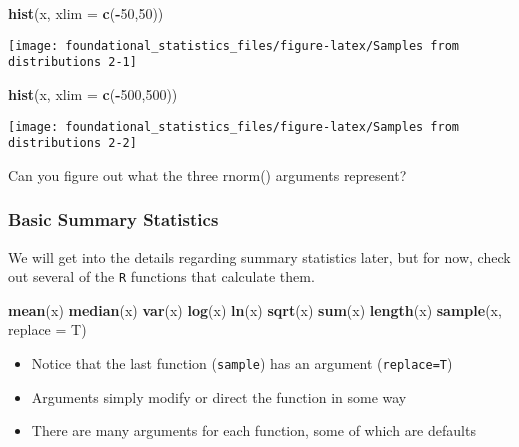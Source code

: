 \documentclass[]{book}
\newenvironment{Shaded}{\begin{snugshade}}{\end{snugshade}}
\newcommand{\DataTypeTok}[1]{\textcolor[rgb]{0.13,0.29,0.53}{#1}}
\newcommand{\DecValTok}[1]{\textcolor[rgb]{0.00,0.00,0.81}{#1}}
\newcommand{\KeywordTok}[1]{\textcolor[rgb]{0.13,0.29,0.53}{\textbf{#1}}}
\newcommand{\NormalTok}[1]{#1}
\newcommand{\OperatorTok}[1]{\textcolor[rgb]{0.81,0.36,0.00}{\textbf{#1}}}
\begin{document}
\begin{Shaded}
\begin{Highlighting}[]
\KeywordTok{hist}\NormalTok{(x, }\DataTypeTok{xlim =} \KeywordTok{c}\NormalTok{(}\OperatorTok{-}\DecValTok{50}\NormalTok{,}\DecValTok{50}\NormalTok{))}
\end{Highlighting}
\end{Shaded}

\texttt{[image: foundational\_statistics\_files/figure-latex/Samples from distributions 2-1]}

\begin{Shaded}
\begin{Highlighting}[]
\KeywordTok{hist}\NormalTok{(x, }\DataTypeTok{xlim =} \KeywordTok{c}\NormalTok{(}\OperatorTok{-}\DecValTok{500}\NormalTok{,}\DecValTok{500}\NormalTok{))}
\end{Highlighting}
\end{Shaded}

\texttt{[image: foundational\_statistics\_files/figure-latex/Samples from distributions 2-2]}

Can you figure out what the three rnorm() arguments represent?

\hypertarget{basic-summary-statistics}{%
\subsubsection{Basic Summary Statistics}\label{basic-summary-statistics}}

We will get into the details regarding summary statistics later, but for now, check out several of the \texttt{R} functions that calculate them.

\begin{Shaded}
\begin{Highlighting}[]
\KeywordTok{mean}\NormalTok{(x)}
\KeywordTok{median}\NormalTok{(x)}
\KeywordTok{var}\NormalTok{(x)}
\KeywordTok{log}\NormalTok{(x)}
\KeywordTok{ln}\NormalTok{(x)}
\KeywordTok{sqrt}\NormalTok{(x)}
\KeywordTok{sum}\NormalTok{(x)}
\KeywordTok{length}\NormalTok{(x)}
\KeywordTok{sample}\NormalTok{(x, }\DataTypeTok{replace =}\NormalTok{ T)}
\end{Highlighting}
\end{Shaded}

\begin{itemize}
\item
  Notice that the last function (\texttt{sample}) has an argument (\texttt{replace=T})
\item
  Arguments simply modify or direct the function in some way
\item
  There are many arguments for each function, some of which are defaults
\end{itemize}
\end{document}
